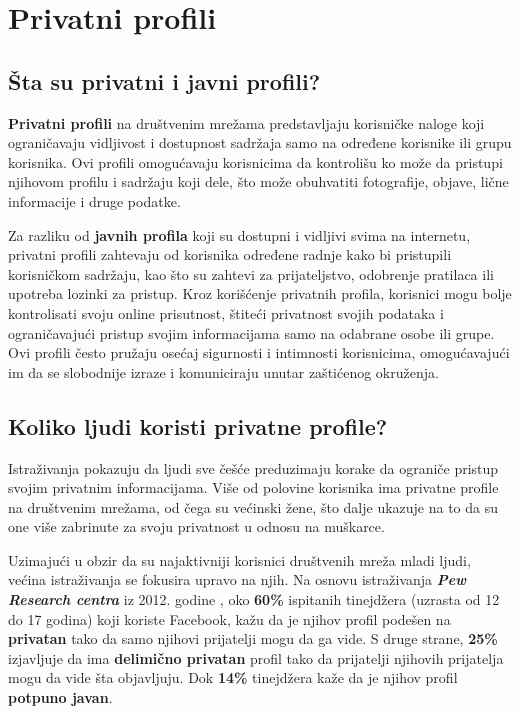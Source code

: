 \documentclass[12pt, a4paper]{article}
\begin{document}
{\newpage
\section{Privatni profili}
\subsection{Šta su privatni i javni profili?}
\label{sec:Priv}

\textbf{Privatni profili }na društvenim mrežama predstavljaju korisničke naloge koji ograničavaju vidljivost i dostupnost sadržaja samo na određene korisnike ili grupu korisnika. Ovi profili omogućavaju korisnicima da kontrolišu ko može da pristupi njihovom profilu i sadržaju koji dele, što može obuhvatiti fotografije, objave, lične informacije i druge podatke. 


Za razliku od \textbf{javnih profila} koji su dostupni i vidljivi svima na internetu, privatni profili zahtevaju od korisnika određene radnje kako bi pristupili korisničkom sadržaju, kao što su zahtevi za prijateljstvo, odobrenje pratilaca ili upotreba lozinki za pristup. Kroz korišćenje privatnih profila, korisnici mogu bolje kontrolisati svoju online prisutnost, štiteći privatnost svojih podataka i ograničavajući pristup svojim informacijama samo na odabrane osobe ili grupe. Ovi profili često pružaju osećaj sigurnosti i intimnosti korisnicima, omogućavajući im da se slobodnije izraze i komuniciraju unutar zaštićenog okruženja.

\subsection{Koliko ljudi koristi privatne profile?}

Istraživanja pokazuju da ljudi sve češće preduzimaju korake da ograniče pristup svojim privatnim informacijama. Više od polovine korisnika ima privatne profile na društvenim mrežama, od čega su većinski žene, što dalje ukazuje na to da su one više zabrinute za svoju privatnost u odnosu na muškarce.


Uzimajući u obzir da su najaktivniji korisnici društvenih mreža mladi ljudi, većina istraživanja se fokusira upravo na njih. Na osnovu istraživanja \textit{\textbf{Pew Research centra}} iz 2012. godine \cite{pew2012}, oko \textbf{60\%} ispitanih tinejdžera (uzrasta od 12 do 17 godina) koji koriste Facebook, kažu da je njihov profil podešen na \textbf{privatan} tako da samo njihovi prijatelji mogu da ga vide. S druge strane, \textbf{25\%} izjavljuje da ima \textbf{delimično privatan} profil tako da prijatelji njihovih prijatelja mogu da vide šta objavljuju. Dok \textbf{14\%} tinejdžera kaže da je njihov profil \textbf{potpuno javan}.

}
\end{document}
